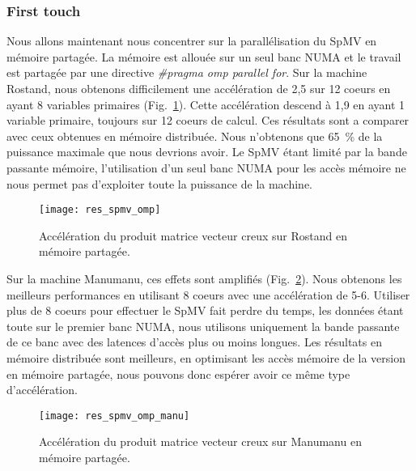 \subsubsection{First touch}
Nous allons maintenant nous concentrer sur la parallélisation du SpMV en mémoire partagée.
%
La mémoire est allouée sur un seul banc NUMA et le travail est partagée par une directive {\em \#pragma omp parallel for}.
%
Sur la machine Rostand, nous obtenons difficilement une accélération de 2,5 sur 12 coeurs en ayant 8 variables primaires (Fig.~\ref{fig:res_spmv_omp_rostand}).
%
Cette accélération descend à 1,9 en ayant 1 variable primaire, toujours sur 12 coeurs de calcul.
%
Ces résultats sont a comparer avec ceux obtenues en mémoire distribuée.
%
Nous n'obtenons que 65~\% de la puissance maximale que nous devrions avoir.
%
Le SpMV étant limité par la bande passante mémoire, l'utilisation d'un seul banc NUMA pour les accès mémoire ne nous permet pas d'exploiter toute la puissance de la machine.


\begin{figure}[t!]
  \centering
  \texttt{[image: res\_spmv\_omp]}
  \caption{Accélération du produit matrice vecteur creux sur Rostand en mémoire partagée.}
  \label{fig:res_spmv_omp_rostand}
\end{figure}



Sur la machine Manumanu, ces effets sont amplifiés (Fig.~\ref{fig:res_spmv_omp_manumanu}).
%
Nous obtenons les meilleurs performances en utilisant 8 coeurs avec une accélération de 5-6.
%
Utiliser plus de 8 coeurs pour effectuer le SpMV fait perdre du temps, les données étant toute sur le premier banc NUMA, nous utilisons uniquement la bande passante de ce banc avec des latences d'accès plus ou moins longues.
%
Les résultats en mémoire distribuée sont meilleurs, en optimisant les accès mémoire de la version en mémoire partagée, nous pouvons donc espérer avoir ce même type d'accélération.


\begin{figure}[t!]
  \centering
  \texttt{[image: res\_spmv\_omp\_manu]}
  \caption{Accélération du produit matrice vecteur creux sur Manumanu en mémoire partagée.}
  \label{fig:res_spmv_omp_manumanu}
\end{figure}
